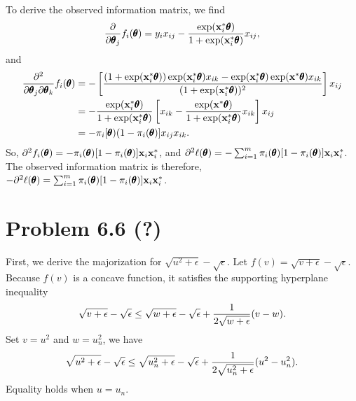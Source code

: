 \documentclass{scrartcl}
\begin{document}
To derive the observed information matrix, we find
\begin{equation}
    { \partial \over \partial \pmb{\theta}_j } f_i (\pmb{\theta})
    = y_i x_{ij} - {\exp(\mathbf{x}_i^*\pmb{\theta}) \over {1+\exp(\mathbf{x}_i^*\pmb{\theta})}}x_{ij},
\end{equation}
and
\begin{equation}
    \begin{split}
    { \partial^2 \over \partial \pmb{\theta}_j \partial \pmb{\theta}_k} f_i (\pmb{\theta})
    & = - \left[
        { {(1+\exp(\mathbf{x}_i^*\pmb{\theta}))\exp(\mathbf{x}_i^*\pmb{\theta})x_{ik} - \exp(\mathbf{x}_i^*\pmb{\theta})\exp(\mathbf{x}^*\pmb{\theta})x_{ik}}
          \over
          {(1+\exp(\mathbf{x}_i^*\pmb{\theta}))^2}}
        \right]x_{ij} \\
    & = - {\exp(\mathbf{x}_i^*\pmb{\theta}) \over {1+\exp(\mathbf{x}_i^*\pmb{\theta})}}
        \left[
        x_{ik} - { {\exp(\mathbf{x}^*\pmb{\theta})} \over {1+\exp(\mathbf{x}_i^*\pmb{\theta})}} x_{ik}
        \right] x_{ij} \\
    & = -\pi_i [ \pmb{\theta}) (1-\pi_i(\pmb{\theta}) ] x_{ij}x_{ik} .
    \end{split}
\end{equation}
So, $\partial^2 f_i(\pmb{\theta}) = -\pi_i(\pmb{\theta}) [ 1-\pi_i(\pmb{\theta}) ] \mathbf{x}_i\mathbf{x}_i^*$, and
$\partial^2 \ell(\pmb{\theta}) = -\sum_{i=1}^m \pi_i(\pmb{\theta}) [ 1-\pi_i(\pmb{\theta}) ] \mathbf{x}_i\mathbf{x}_i^*$.
The observed information matrix is therefore,
$-\partial^2 \ell(\pmb{\theta}) = \sum_{i=1}^m \pi_i(\pmb{\theta}) [ 1-\pi_i(\pmb{\theta}) ] \mathbf{x}_i\mathbf{x}_i^*$.


\section*{Problem 6.6 (?)}

First, we derive the majorization for $\sqrt{u^2+\epsilon}-\sqrt{\epsilon}$. Let $f(v) = \sqrt{v+\epsilon} - \sqrt{\epsilon}$.
Because $f(v)$ is a concave function, it satisfies the supporting hyperplane inequality
\begin{equation}
\sqrt{v+\epsilon}-\sqrt{\epsilon} \le \sqrt{w+\epsilon} - \sqrt{\epsilon} + {1 \over 2 \sqrt{w+\epsilon}}(v-w).
\label{eqn:concave_ineq}
\end{equation}
Set $v = u^2$ and $w = u_n^2$, we have
\begin{equation}
\sqrt{u^2+\epsilon}-\sqrt{\epsilon} \le \sqrt{u_n^2+\epsilon}-\sqrt{\epsilon} + {1 \over 2 \sqrt{u_n^2+\epsilon}}(u^2-u_n^2).
\end{equation}
Equality holds when $u = u_n$.
\end{document}
